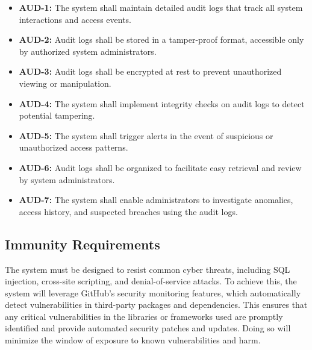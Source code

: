 \documentclass[12pt]{article}
\begin{document}
\begin{itemize}
    \item \textbf{AUD-1:} The system shall maintain detailed audit logs that track all system interactions and access events.
    \item \textbf{AUD-2:} Audit logs shall be stored in a tamper-proof format, accessible only by authorized system administrators.
    \item \textbf{AUD-3:} Audit logs shall be encrypted at rest to prevent unauthorized viewing or manipulation.
    \item \textbf{AUD-4:} The system shall implement integrity checks on audit logs to detect potential tampering.
    \item \textbf{AUD-5:} The system shall trigger alerts in the event of suspicious or unauthorized access patterns.
    \item \textbf{AUD-6:} Audit logs shall be organized to facilitate easy retrieval and review by system administrators.
    \item \textbf{AUD-7:} The system shall enable administrators to investigate anomalies, access history, and suspected breaches using the audit logs.
\end{itemize}

\subsection{Immunity Requirements}
The system must be designed to resist common cyber threats, including SQL injection, cross-site scripting, and denial-of-service attacks. To achieve this, the system will leverage GitHub's security monitoring features, which automatically detect vulnerabilities in third-party packages and dependencies. This ensures that any critical vulnerabilities in the libraries or frameworks used are promptly identified and provide automated security patches and updates. Doing so will minimize the window of exposure to known vulnerabilities and harm.
\end{document}

